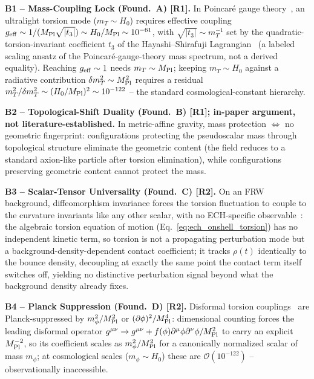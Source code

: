 \documentclass[aps,prd,twocolumn,superscriptaddress,preprintnumbers,nofootinbib,longbibliography,floatfix]{revtex4-2}
\newcommand{\MPl}{M_{\rm Pl}}
\begin{document}
\medskip\noindent\textbf{B1 -- Mass-Coupling Lock (Found.\ A) [R1].} In
Poincar\'e gauge theory~\cite{HayashiShirafuji1980,BlagojevicHehl2013}, an ultralight torsion mode ($m_T\sim H_0$)
requires effective coupling $g_{\rm eff}\sim1/(\MPl\sqrt{|t_3|})\sim
H_0/\MPl\sim10^{-61}$, with $\sqrt{|t_3|}\sim m_T^{-1}$ set by the
quadratic-torsion-invariant coefficient $t_3$ of the Hayashi--Shirafuji
Lagrangian~\cite{HayashiShirafuji1980} (a labeled scaling ansatz of the
Poincar\'e-gauge-theory mass spectrum, not a derived equality). Reaching $g_{\rm eff}\sim1$ needs $m_T\sim\MPl$;
keeping $m_T\sim H_0$ against a radiative contribution
$\delta m_T^2\sim\MPl^2$ requires a residual
$m_T^2/\delta m_T^2\sim(H_0/\MPl)^2\sim10^{-122}$ -- the standard
cosmological-constant hierarchy.

\medskip\noindent\textbf{B2 -- Topological-Shift Duality (Found.\ B)
[R1]; in-paper argument, not literature-established.} In metric-affine gravity, mass protection $\iff$ no geometric
fingerprint: configurations protecting the pseudoscalar mass through
topological structure eliminate the geometric content (the field reduces
to a standard axion-like particle after torsion elimination), while
configurations preserving geometric content cannot protect the mass.

\medskip\noindent\textbf{B3 -- Scalar-Tensor Universality (Found.\ C)
[R2].} On an FRW background, diffeomorphism invariance forces the
torsion fluctuation to couple to the curvature invariants like any other
scalar, with no ECH-specific observable~\cite{Hehl1976}: the algebraic
torsion equation of motion (Eq.~\eqref{eq:ech_onshell_torsion}) has no
independent kinetic term, so torsion is not a propagating perturbation
mode but a background-density-dependent contact coefficient; it tracks
$\rho(t)$ identically to the bounce density, decoupling at exactly the
same point the contact term itself switches off, yielding no distinctive
perturbation signal beyond what the background density already fixes.

\medskip\noindent\textbf{B4 -- Planck Suppression (Found.\ D) [R2].}
Disformal torsion couplings~\cite{Shapiro2002} are Planck-suppressed by $m_\phi^2/\MPl^2$ or
$(\partial\phi)^2/\MPl^4$: dimensional counting forces the leading
disformal operator $g^{\mu\nu}\to g^{\mu\nu}+f(\phi)\partial^\mu\phi\partial^\nu\phi/\MPl^2$
to carry an explicit $\MPl^{-2}$, so its coefficient scales as
$m_\phi^2/\MPl^2$ for a canonically normalized scalar of mass $m_\phi$;
at cosmological scales ($m_\phi\sim H_0$)
these are $\mathcal O(10^{-122})$ -- observationally inaccessible.
\end{document}
